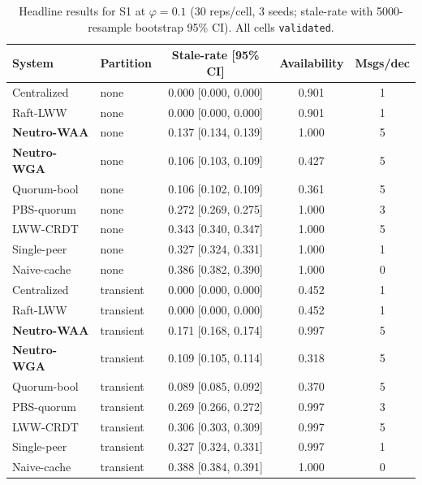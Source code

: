 \begin{table}[t]
\centering
\small
\caption{Headline results for S1 at $\varphi=0.1$ (30 reps/cell, 3 seeds; stale-rate with 5000-resample bootstrap 95\% CI). All cells \texttt{validated}.}
\label{tab:headline-s1}
\begin{tabular}{llccc}
\toprule
System & Partition & Stale-rate [95\% CI] & Availability & Msgs/dec \\
\midrule
Centralized & none & 0.000 [0.000, 0.000] & 0.901 & 1 \\
Raft-LWW & none & 0.000 [0.000, 0.000] & 0.901 & 1 \\
\textbf{Neutro-WAA} & none & 0.137 [0.134, 0.139] & 1.000 & 5 \\
\textbf{Neutro-WGA} & none & 0.106 [0.103, 0.109] & 0.427 & 5 \\
Quorum-bool & none & 0.106 [0.102, 0.109] & 0.361 & 5 \\
PBS-quorum & none & 0.272 [0.269, 0.275] & 1.000 & 3 \\
LWW-CRDT & none & 0.343 [0.340, 0.347] & 1.000 & 5 \\
Single-peer & none & 0.327 [0.324, 0.331] & 1.000 & 1 \\
Naive-cache & none & 0.386 [0.382, 0.390] & 1.000 & 0 \\
Centralized & transient & 0.000 [0.000, 0.000] & 0.452 & 1 \\
Raft-LWW & transient & 0.000 [0.000, 0.000] & 0.452 & 1 \\
\textbf{Neutro-WAA} & transient & 0.171 [0.168, 0.174] & 0.997 & 5 \\
\textbf{Neutro-WGA} & transient & 0.109 [0.105, 0.114] & 0.318 & 5 \\
Quorum-bool & transient & 0.089 [0.085, 0.092] & 0.370 & 5 \\
PBS-quorum & transient & 0.269 [0.266, 0.272] & 0.997 & 3 \\
LWW-CRDT & transient & 0.306 [0.303, 0.309] & 0.997 & 5 \\
Single-peer & transient & 0.327 [0.324, 0.331] & 0.997 & 1 \\
Naive-cache & transient & 0.388 [0.384, 0.391] & 1.000 & 0 \\
\bottomrule
\end{tabular}
\end{table}
